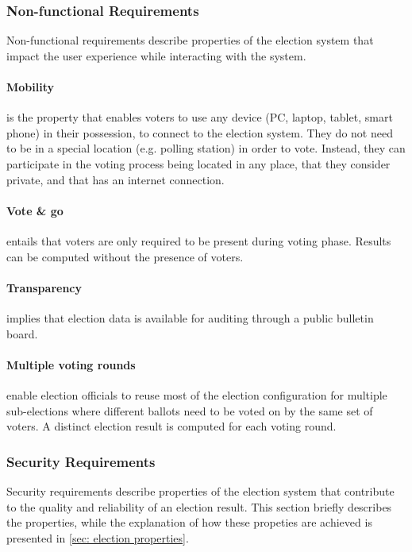 \subsubsection{Non-functional Requirements} \label{sec: non-functional requirements}
Non-functional requirements describe properties of the election system that impact the user experience while interacting with the system. 

\paragraph{Mobility} is the property that enables voters to use any device (PC, laptop, tablet, smart phone) in their possession, to connect to the election system. They do not need to be in a special location (e.g. polling station) in order to vote. Instead, they can participate in the voting process being located in any place, that they consider private, and that has an internet connection.

\paragraph{Vote \& go} entails that voters are only required to be present during voting phase. Results can be computed without the presence of voters.

\paragraph{Transparency} implies that election data is available for auditing through a public bulletin board.

\paragraph{Multiple voting rounds} enable election officials to reuse most of the election configuration for multiple sub-elections where different ballots need to be voted on by the same set of voters. A distinct election result is computed for each voting round. 


\subsubsection{Security Requirements} \label{sec: security requirements}
Security requirements describe properties of the election system that contribute to the quality and reliability of an election result. This section briefly describes the properties, while the explanation of how these propeties are achieved is presented in \cref{sec: election properties}.

